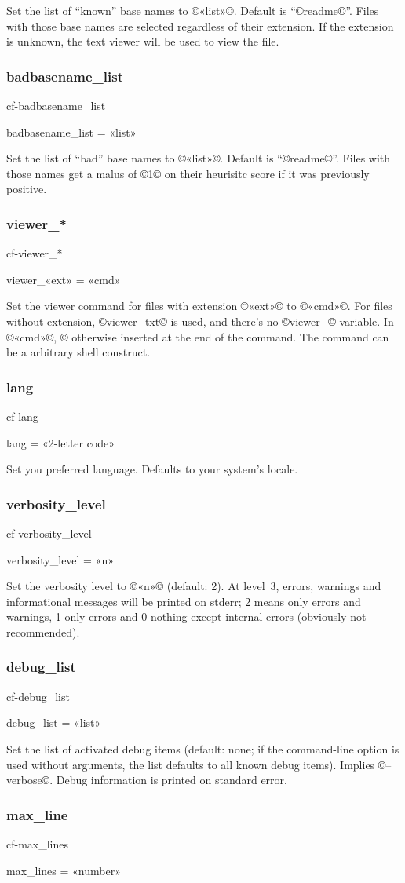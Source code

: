 \documentclass[a4paper, oneside]{scrartcl}
\newif\ifframed
\newenvironment{cmdsubsub}[2]{%
  \framedfalse \commandes\subsubsection{#1}{#2}%
  }{%
  \endcommandes}
\begin{document}
Set the list of ``known'' base names to ©«list»©.  Default is ``©readme©''.
Files with those base names are selected regardless of their extension. If the
extension is unknown, the text viewer will be used to view the file.

\begin{cmdsubsub}{badbasename_list}{cf-badbasename_list}
  badbasename_list = «list»
\end{cmdsubsub}

Set the list of ``bad'' base names to ©«list»©.  Default is ``©readme©''. Files
with those names get a malus of ©1© on their heurisitc score if it was
previously positive.

\begin{cmdsubsub}{viewer_*}{cf-viewer_*}
  viewer_«ext» = «cmd»
\end{cmdsubsub}

Set the viewer command for files with extension ©«ext»© to ©«cmd»©. For files
without extension, ©viewer_txt© is used, and there's no ©viewer_© variable.
In ©«cmd»©, ©%
otherwise inserted at the end of the command.  The command can be a arbitrary
shell construct.

\begin{cmdsubsub}{lang}{cf-lang}
  lang = «2-letter code»
\end{cmdsubsub}

Set you preferred language. Defaults to your system's locale.

\begin{cmdsubsub}{verbosity_level}{cf-verbosity_level}
  verbosity_level = «n»
\end{cmdsubsub}

Set the verbosity level to ©«n»© (default: 2). At level~3, errors, warnings and
informational messages will be printed on stderr; 2 means only errors and
warnings, 1 only errors and 0 nothing except internal errors (obviously not
recommended).

\begin{cmdsubsub}{debug_list}{cf-debug_list}
  debug_list = «list»
\end{cmdsubsub}

Set the list of activated debug items (default: none; if the command-line
option is used without arguments, the list defaults to all known debug items).
Implies ©--verbose©. Debug information is printed on standard error.

\begin{cmdsubsub}{max_line}{cf-max_lines}
  max_lines = «number»
\end{cmdsubsub}
\end{document}
